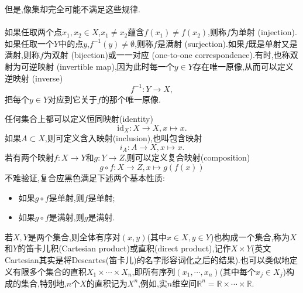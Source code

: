 \begin{frame}
	但是,像集却完全可能不满足这些规律.
		\\ \hspace*{\fill} \\%
	如果任取两个点$x_1,x_2\in X$,$x_1\neq x_2$蕴含$f(x_1)\neq f(x_2)$,则称$f$为\alert{单射} (injection).如果任取一个$Y$中的点$y$,$f^{-1}(y)\neq\emptyset$,则称$f$是\alert{满射} (surjection).如果$f$既是单射又是满射,则称$f$为\alert{双射} (bijection)或\alert{一一对应} (one-to-one correspondence).有时,也称双射为\alert{可逆映射} (invertible map),因为此时每一个$y\in Y$存在唯一原像,从而可以定义\alert{逆映射} (inverse)
	\begin{equation}
		f^{-1}:Y\to X,
	\end{equation}
	把每个$y\in Y$对应到它关于$f$的那个唯一原像.
\end{frame}

\begin{frame}
	任何集合上都可以定义\alert{恒同映射}(identity)\begin{equation}
		\mathrm{id}_X:X\to X,x\mapsto x.
	\end{equation}
	如果$A\subset X$,则可定义\alert{含入映射}(inclusion),也叫\alert{包含映射}\begin{equation}
		i_A:A\to X,x\mapsto x.
	\end{equation}
	若有两个映射$f:X\to Y$和$g:Y\to Z$,则可以定义\alert{复合映射}(composition)\begin{equation}
		g\circ f:X\to Z,x\mapsto g(f(x))
	\end{equation}
	不难验证,复合应黑色满足下述两个基本性质:
	\begin{itemize}
		\item 如果$g\circ f$是单射,则$f$是单射;
		\item 如果$g\circ f$是满射,则$g$是满射.
	\end{itemize}
\end{frame}

\begin{frame}
	若$X,Y$是两个集合,则全体有序对$(x,y)$(其中$x\in X,y\in Y$)也构成一个集合,称为$X$和$Y$的\alert{笛卡儿积}(Cartesian product)或\alert{直积}(direct product),记作$X\times Y$(英文Cartesian其实是将Descartes(笛卡儿)的名字形容词化之后的结果).也可以类似地定义有限多个集合的直积$X_1\times \cdots \times X_n$,即所有序列$(x_1,\cdots,x_n)$(其中每个$x_j\in X_j$)构成的集合,特别地,$n$个$X$的直积记为$X^n$,例如,实$n$维空间$\mathbb{R}^n = \mathbb{R}\times\cdots\times\mathbb{R}$.
\end{frame}



